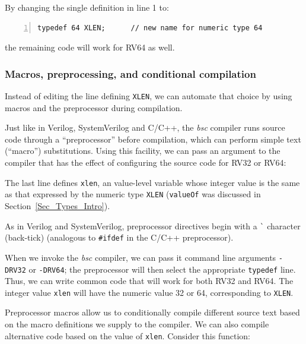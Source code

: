 By changing the single definition in line 1 to:

{\footnotesize
\begin{Verbatim}[frame=single, numbers=left]
   typedef 64 XLEN;      // new name for numeric type 64
\end{Verbatim}
}

the remaining code will work for RV64 as well.


\subsubsection{Macros, preprocessing, and conditional compilation}

\label{BSV_Conditional_compilation}


Instead of editing the line defining {\tt XLEN}, we can automate that
choice by using macros and the preprocessor during compilation.

Just like in Verilog, SystemVerilog and C/C++, the \emph{bsc} compiler
runs {\BSV} source code through a ``preprocessor'' before compilation,
which can perform simple text (``macro'') substitutions.  Using this
facility, we can pass an argument to the compiler that has the effect
of configuring the source code for RV32 or RV64:


The last line defines \verb|xlen|, an value-level variable whose
integer value is the same as that expressed by the numeric type
\verb|XLEN| ({\tt valueOf} was discussed in
Section~\ref{Sec_Types_Intro}).

As in Verilog and SystemVerilog, preprocessor directives begin with a
\verb|`| character (back-tick) (analogous to \verb|#ifdef| in the
C/C++ preprocessor).

When we invoke the \emph{bsc} compiler, we can pass it command line
arguments \verb|-DRV32| or \verb|-DRV64|; the preprocessor will then
select the appropriate \verb|typedef| line.  Thus, we can write common
code that will work for both RV32 and RV64.  The integer value
\verb|xlen| will have the numeric value 32 or 64, corresponding to
{\tt XLEN}.

Preprocessor macros allow us to conditionally compile different source
text based on the macro definitions we supply to the compiler.  We can
also compile alternative code based on the value of \verb|xlen|.
Consider this function:

